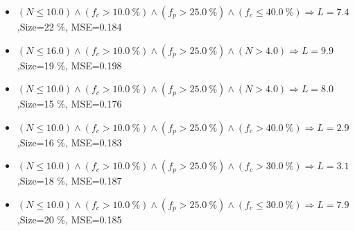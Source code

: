 \documentclass[numbered]{CSL}
\begin{document}
\begin{itemize}
\item $(N \leq 10.0) \land (f_c > 10.0~\%) \land (f_p > 25.0~\%) \land (f_c \leq 40.0~\%) \Rightarrow L = 7.4$,\hfill Size=22 \%, MSE=0.184
\item $(N \leq 16.0) \land (f_c > 10.0~\%) \land (f_p > 25.0~\%) \land (N > 4.0) \Rightarrow L = 9.9$,\hfill Size=19 \%, MSE=0.198
\item $(N \leq 10.0) \land (f_c > 10.0~\%) \land (f_p > 25.0~\%) \land (N > 4.0) \Rightarrow L = 8.0$,\hfill Size=15 \%, MSE=0.176
\item $(N \leq 10.0) \land (f_c > 10.0~\%) \land (f_p > 25.0~\%) \land (f_c > 40.0~\%) \Rightarrow L = 2.9$,\hfill Size=16 \%, MSE=0.183
\item $(N \leq 10.0) \land (f_c > 10.0~\%) \land (f_p > 25.0~\%) \land (f_c > 30.0~\%) \Rightarrow L = 3.1$,\hfill Size=18 \%, MSE=0.187
\item $(N \leq 10.0) \land (f_c > 10.0~\%) \land (f_p > 25.0~\%) \land (f_c \leq 30.0~\%) \Rightarrow L = 7.9$,\hfill Size=20 \%, MSE=0.185
\end{itemize}
\end{document}
